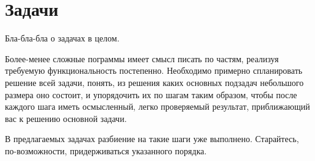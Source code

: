 \chapter{Задачи}

Бла-бла-бла о задачах в целом.

Более-менее сложные пограммы имеет смысл писать по частям, реализуя требуемую
функциональность постепенно. Необходимо примерно спланировать решение всей
задачи, понять, из решения каких основных подзадач небольшого размера оно
состоит, и упорядочить их по шагам таким образом, чтобы после каждого шага
иметь осмысленный, легко проверяемый результат, приближающий вас к решению
основной задачи.

В предлагаемых задачах разбиение на такие шаги уже выполнено. Старайтесь,
по-возможности, придерживаться указанного порядка.




















\endinput

\chapter{На доработку}

С этими задачами уже не столь очевидно, как надо поступить. Хотелось бы их
рано или поздно довести до ума и включить в общий котёл --- они пригодятся.
К сожалению, доработка требуется достаточно серъёзная.

